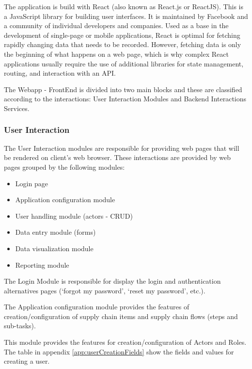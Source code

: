 The application is build with React (also known as React.js or ReactJS). This is a JavaScript library for building user interfaces. It is maintained by Facebook and a community of individual developers and companies. Used as a base in the development of single-page or mobile applications, React is optimal for fetching rapidly changing data that needs to be recorded. However, fetching data is only the beginning of what happens on a web page, which is why complex React applications usually require the use of additional libraries for state management, routing, and interaction with an API.

The Webapp - FrontEnd is divided into two main blocks and these are classified according to the interactions: User Interaction Modules and Backend Interactions Services.

\subsubsection{User Interaction}\label{sec:UserInteraction}
The User Interaction modules are responsible for providing web pages that will be rendered on client’s web browser. These interactions are provided by web pages grouped by the following modules:

\begin{itemize}
\item Login page
\item Application configuration module
\item User handling module (actors - CRUD)
\item Data entry module (forms)
\item Data visualization module
\item Reporting module
\end{itemize}

The Login Module is responsible for display the login and authentication alternatives pages (‘forgot my password’, ‘reset my password’, etc.).

The Application configuration module provides the features of creation/configuration of supply chain items and supply chain flows (steps and sub-tasks).

This module provides the features for creation/configuration of Actors and Roles. The table in appendix \ref{app:userCreationFields} show the fields and values for creating a user.

